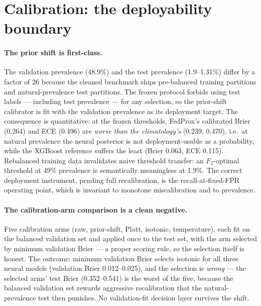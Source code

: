 \section{Calibration: the deployability boundary}\label{sec:calibration}

\paragraph{The prior shift is first-class.}
The validation prevalence (48.9\%) and the test prevalence
(1.9--1.31\%) differ by a factor of 26 because the cleaned benchmark
ships pre-balanced training partitions and natural-prevalence test
partitions. The frozen protocol forbids using test labels ---
including test prevalence --- for any selection, so the prior-shift
calibrator is fit with the validation prevalence as its deployment
target. The consequence is quantitative: at the frozen thresholds,
FedProx's calibrated Brier (0.264) and ECE (0.496) are \emph{worse
than the climatology's} (0.239, 0.470), i.e.\ at natural prevalence
the neural posterior is not deployment-usable as a probability,
while the XGBoost reference suffers the least (Brier 0.063, ECE
0.115). Rebalanced training data invalidates naive threshold
transfer: an $F_2$-optimal threshold at 49\% prevalence is
semantically meaningless at 1.9\%. The correct deployment
instrument, pending full recalibration, is the recall-at-fixed-FPR
operating point, which is invariant to monotone miscalibration and
to prevalence.

\paragraph{The calibration-arm comparison is a clean negative.}
Five calibration arms (raw, prior-shift, Platt, isotonic,
temperature), each fit on the balanced validation set and applied
once to the test set, with the arm selected by minimum validation
Brier --- a proper scoring rule, so the selection itself is honest.
The outcome: minimum validation Brier selects isotonic for all three
neural models (validation Brier 0.012--0.025), and the selection is
\emph{wrong} --- the selected arms' test Brier (0.352--0.541) is the
worst of the five, because the balanced validation set rewards
aggressive recalibration that the natural-prevalence test then
punishes. No validation-fit decision layer survives the shift.

